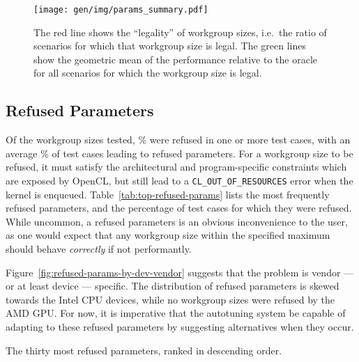 \begin{figure}
\centering
\texttt{[image: gen/img/params\_summary.pdf]}
\caption{%
  The red line shows the ``legality'' of workgroup sizes, i.e.\ the
  ratio of scenarios for which that workgroup size is legal.  The
  green lines show the geometric mean of the performance relative to
  the oracle for all scenarios for which the workgroup size is legal.%
}
\label{fig:performance-legality}
\end{figure}

\subsection{Refused Parameters}

Of the  workgroup sizes tested,
\% were refused in one or more test
cases, with an average \% of test
cases leading to refused parameters. For a workgroup size to be
refused, it must satisfy the architectural and program-specific
constraints which are exposed by OpenCL, but still lead to a
\texttt{CL\_OUT\_OF\_RESOURCES} error when the kernel is
enqueued. Table~\ref{tab:top-refused-params} lists the most frequently
refused parameters, and the percentage of test cases for which they
were refused. While uncommon, a refused parameters is an obvious
inconvenience to the user, as one would expect that any workgroup size
within the specified maximum should behave \emph{correctly} if not
performantly.

Figure~\ref{fig:refused-params-by-dev-vendor} suggests that the
problem is vendor --- or at least device --- specific. The
distribution of refused parameters is skewed towards the Intel CPU
devices, while no workgroup sizes were refused by the AMD
GPU.  For now, it is imperative that the
autotuning system be capable of adapting to these refused parameters
by suggesting alternatives when they occur.

\begin{table}
\parbox{.32\linewidth}{
    \centering
    \scriptsize
    
  }
  \hfill
  \parbox{.32\linewidth}{
    \centering
    \scriptsize
    
  }
  \hfill
  \parbox{.32\linewidth}{
    \centering
    \scriptsize
    
  }
  \caption{The thirty most refused parameters, ranked in descending
    order.}
  \label{tab:top-refused-params}
\end{table}

